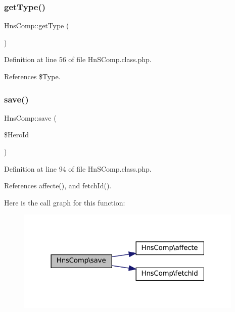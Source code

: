 \subsubsection{\texorpdfstring{get\+Type()}{getType()}}
{\footnotesize\ttfamily Hns\+Comp\+::get\+Type (\begin{DoxyParamCaption}{ }\end{DoxyParamCaption})}



Definition at line 56 of file Hn\+S\+Comp.\+class.\+php.



References \$\+Type.

\mbox{\label{class_hns_comp_a944af7f4ecf66994cf2ed4cbb27a566e}} 
\subsubsection{\texorpdfstring{save()}{save()}}
{\footnotesize\ttfamily Hns\+Comp\+::save (\begin{DoxyParamCaption}\item[{}]{\$\+Hero\+Id }\end{DoxyParamCaption})}



Definition at line 94 of file Hn\+S\+Comp.\+class.\+php.



References affecte(), and fetch\+Id().

Here is the call graph for this function\+:\nopagebreak
\begin{figure}[H]
\begin{center}
\leavevmode
\includegraphics[width=307pt]{class_hns_comp_a944af7f4ecf66994cf2ed4cbb27a566e_cgraph}
\end{center}
\end{figure}
\mbox{\label{class_hns_comp_a501b33cbe91e2976f5489779d89ebebd}} 
